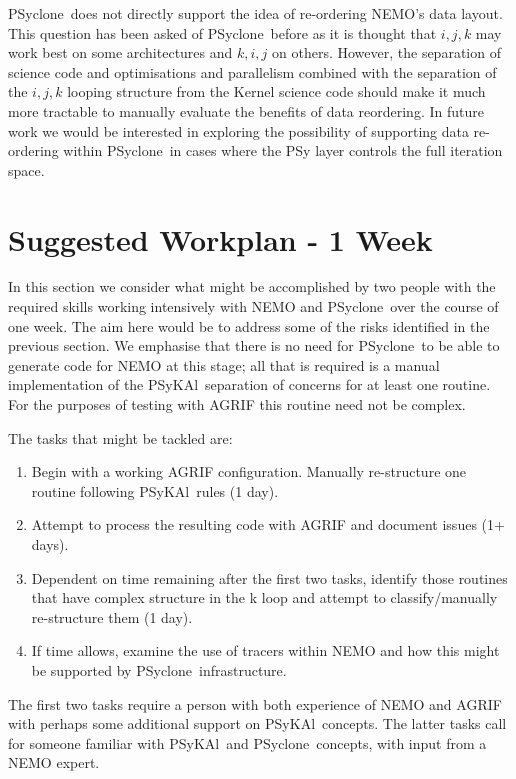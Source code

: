 \documentclass{article}
\newcommand{\psykal}{{PS}y{KA}l}
\newcommand{\psyclone}{{PS}yclone}
\begin{document}
\psyclone\ does not directly support the idea of re-ordering NEMO's data
layout. This question has been asked of \psyclone\ before as it is
thought that $i,j,k$ may work best on some architectures and $k,i,j$ on
others. However, the separation of science code and optimisations and
parallelism combined with the separation of the $i,j,k$ looping
structure from the Kernel science code should make it much more
tractable to manually evaluate the benefits of data reordering. In
future work we would be interested in exploring the possibility of
supporting data re-ordering within \psyclone\ in cases where the PSy
layer controls the full iteration space.

\section{Suggested Workplan - 1 Week}

In this section we consider what might be accomplished by two people
with the required skills working intensively with NEMO and \psyclone\
over the course of one week. The aim here would be to address some of
the risks identified in the previous section. We emphasise that there
is no need for \psyclone\ to be able to generate code for NEMO at this
stage; all that is required is a manual implementation of the
\psykal\ separation of concerns for at least one routine. For the
purposes of testing with AGRIF this routine need not be complex.

The tasks that might be tackled are:
\begin{enumerate}

\item Begin with a working AGRIF configuration. Manually 
 re-structure one routine following \psykal\ rules (1 day).

\item Attempt to process the resulting code with AGRIF and 
 document issues (1+ days).

\item Dependent on time remaining after the first two tasks, identify
  those routines that have complex structure in the k loop and attempt
  to classify/manually re-structure them (1 day).

\item If time allows, examine the use of tracers within NEMO and how
  this might be supported by \psyclone\ infrastructure.

\end{enumerate}
The first two tasks require a person with both experience of NEMO and
AGRIF with perhaps some additional support on \psykal\ concepts.  The
latter tasks call for someone familiar with \psykal\ and \psyclone\
concepts, with input from a NEMO expert.
\end{document}
